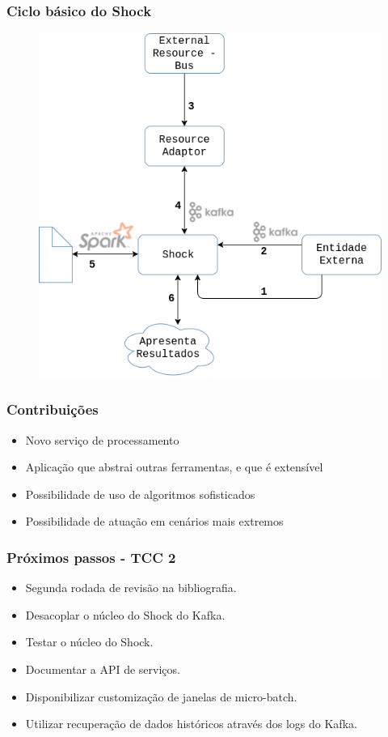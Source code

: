 \documentclass{beamer}
\begin{document}
  \begin{frame}
      \frametitle{Ciclo básico do Shock}
          \begin{figure}
              \includegraphics[scale=0.3]{figures/shock.png}
          \end{figure}
  \end{frame}

  \begin{frame}
      \frametitle{Contribuições}
      \begin{itemize}
          \item Novo serviço de processamento
          \item Aplicação que abstrai outras ferramentas, e que é extensível
          \item Possibilidade de uso de algoritmos sofisticados
          \item Possibilidade de atuação em cenários mais extremos
      \end{itemize}
  \end{frame}

  \begin{frame}
      \frametitle{Próximos passos - TCC 2}
      \begin{itemize}
          \item Segunda rodada de revisão na bibliografia.
          \item Desacoplar o núcleo do Shock do Kafka.
          \item Testar o núcleo do Shock.
          \item Documentar a API de serviços.
          \item Disponibilizar customização de janelas de micro-batch.
          \item Utilizar recuperação de dados históricos através dos logs do Kafka.
      \end{itemize}
  \end{frame}
\end{document}
